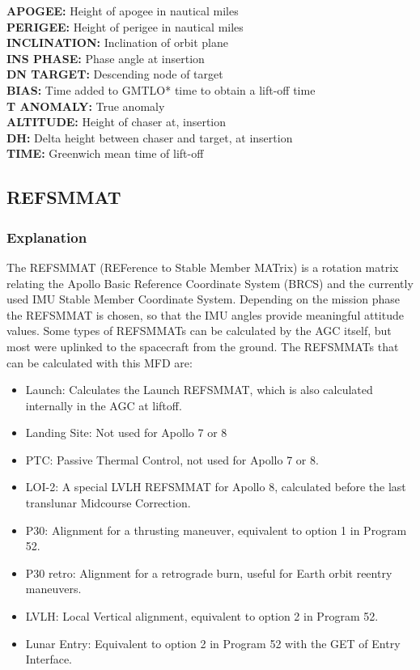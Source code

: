 \documentclass[11pt]{article} %
\begin{document}
\textbf{APOGEE:} Height of apogee in nautical miles\\
\textbf{PERIGEE:} Height of perigee in nautical miles\\
\textbf{INCLINATION:} Inclination of orbit plane\\
\textbf{INS PHASE:} Phase angle at insertion\\
\textbf{DN TARGET:} Descending node of target\\
\textbf{BIAS:} Time added to GMTLO* time to obtain a lift-off time\\
\textbf{T ANOMALY:} True anomaly\\
\textbf{ALTITUDE:} Height of chaser at, insertion\\
\textbf{DH:} Delta height between chaser and target, at insertion\\
\textbf{TIME:} Greenwich mean time of lift-off\\

\newpage
\subsection{REFSMMAT}

\subsubsection{Explanation}

The REFSMMAT (REFerence to Stable Member MATrix) is a rotation matrix relating the Apollo Basic Reference Coordinate System (BRCS) and the currently used IMU Stable Member Coordinate System. Depending on the mission phase the REFSMMAT is chosen, so that the IMU angles provide meaningful attitude values. Some types of REFSMMATs can be calculated by the AGC itself, but most were uplinked to the spacecraft from the ground. The REFSMMATs that can be calculated with this MFD are:

\begin{itemize}
	\item{Launch: Calculates the Launch REFSMMAT, which is also calculated internally in the AGC at liftoff.}
	\item{Landing Site: Not used for Apollo 7 or 8}
	\item{PTC: Passive Thermal Control, not used for Apollo 7 or 8.}
	\item{LOI-2: A special LVLH REFSMMAT for Apollo 8, calculated before the last translunar Midcourse Correction.}
	\item{P30: Alignment for a thrusting maneuver, equivalent to option 1 in Program 52.}
	\item{P30 retro: Alignment for a retrograde burn, useful for Earth orbit reentry maneuvers.}
	\item{LVLH: Local Vertical alignment, equivalent to option 2 in Program 52.}
	\item{Lunar Entry: Equivalent to option 2 in Program 52 with the GET of Entry Interface.}
\end{itemize}
	
\end{document}
